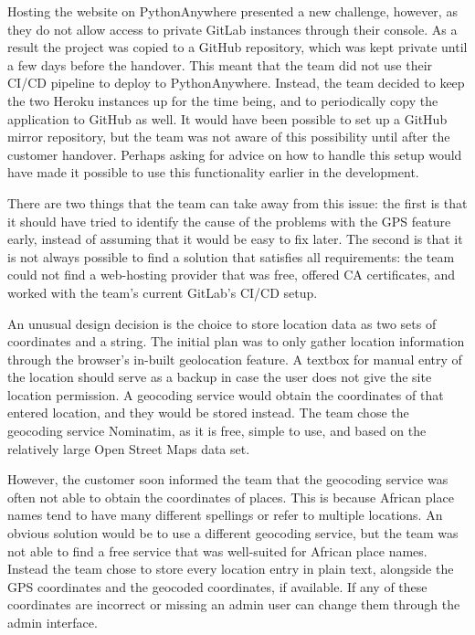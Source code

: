 \documentclass{l3proj}
\begin{document}
Hosting the website on PythonAnywhere presented a new challenge, however, as they do not allow access to private GitLab instances through their console. As a result the project was copied to a GitHub repository, which was kept private until a few days before the handover. This meant that the team did not use their CI/CD pipeline to deploy to PythonAnywhere. Instead, the team decided to keep the two Heroku instances up for the time being, and to periodically copy the application to GitHub as well. It would have been possible to set up a GitHub mirror repository, but the team was not aware of this possibility until after the customer handover. Perhaps asking for advice on how to handle this setup would have made it possible to use this functionality earlier in the development.

There are two things that the team can take away from this issue: the first is that it should have tried to identify the cause of the problems with the GPS feature early, instead of assuming that it would be easy to fix later. The second is that it is not always possible to find a solution that satisfies all requirements: the team could not find a web-hosting provider that was free, offered CA certificates, and worked with the team's current GitLab's CI/CD setup.

An unusual design decision is the choice to store location data as two sets of coordinates and a string. The initial plan was to only gather location information through the browser's in-built geolocation feature. A textbox for manual entry of the location should serve as a backup in case the user does not give the site location permission. A geocoding service would obtain the coordinates of that entered location, and they would be stored instead. The team chose the geocoding service Nominatim, as it is free, simple to use, and based on the relatively large Open Street Maps data set.

However, the customer soon informed the team that the geocoding service was often not able to obtain the coordinates of places. This is because African place names tend to have many different spellings or refer to multiple locations. An obvious solution would be to use a different geocoding service, but the team was not able to find a free service that was well-suited for African place names. Instead the team chose to store every location entry in plain text, alongside the GPS coordinates and the geocoded coordinates, if available. If any of these coordinates are incorrect or missing an admin user can change them through the admin interface.
\end{document}

